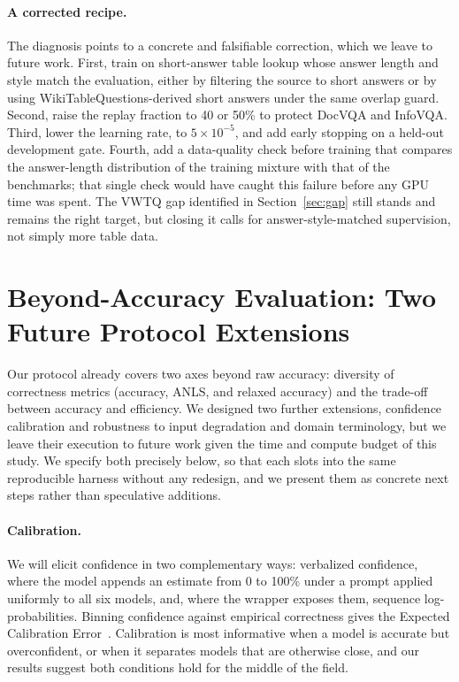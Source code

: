 \documentclass{article}
\begin{document}
\paragraph{A corrected recipe.}
The diagnosis points to a concrete and falsifiable correction, which we leave to
future work. First, train on short-answer table lookup whose answer length and
style match the evaluation, either by filtering the source to short answers or by
using WikiTableQuestions-derived short answers under the same overlap guard.
Second, raise the replay fraction to 40 or 50\% to protect DocVQA and InfoVQA.
Third, lower the learning rate, to $5\times10^{-5}$, and add early stopping on a
held-out development gate. Fourth, add a data-quality check before training that
compares the answer-length distribution of the training mixture with that of the
benchmarks; that single check would have caught this failure before any GPU time
was spent. The VWTQ gap identified in Section~\ref{sec:gap} still stands and
remains the right target, but closing it calls for answer-style-matched
supervision, not simply more table data.

\section{Beyond-Accuracy Evaluation: Two Future Protocol Extensions}
\label{sec:beyond}

Our protocol already covers two axes beyond raw accuracy: diversity of
correctness metrics (accuracy, ANLS, and relaxed accuracy) and the trade-off
between accuracy and efficiency. We designed two further extensions, confidence
calibration and robustness to input degradation and domain terminology, but we
leave their execution to future work given the time and compute budget of this
study. We specify both precisely below, so that each slots into the same
reproducible harness without any redesign, and we present them as concrete next
steps rather than speculative additions.

\paragraph{Calibration.}
We will elicit confidence in two complementary ways: verbalized confidence, where
the model appends an estimate from 0 to 100\% under a prompt applied uniformly to
all six models, and, where the wrapper exposes them, sequence log-probabilities.
Binning confidence against empirical correctness gives the Expected Calibration
Error~\citep{guo2017calibration}. Calibration is most informative when a model is
accurate but overconfident, or when it separates models that are otherwise close,
and our results suggest both conditions hold for the middle of the field.
\end{document}
